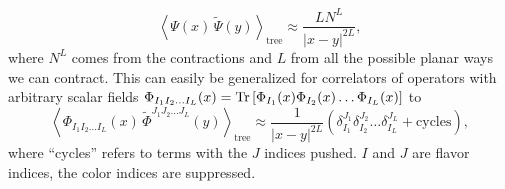 \begin{equation}
	\left< \Psi(x) \, \tilde{\Psi}(y) \right>_{\mathrm{tree}} \approx \frac{L N^L}{|x-y|^{2L}},
\end{equation}
where $N^L$ comes from the contractions and $L$ from all the possible planar ways we can contract. This can easily be generalized for correlators of operators with arbitrary scalar fields $\Phi_{I_1 I_2 \dots I_L}(x) = \mathrm{Tr} \left[ \Phi_{I_1}(x) \Phi_{I_2}(x) \dots \Phi_{I_L}(x) \right]$ to
\begin{equation}
	\left< \Phi_{I_1 I_2 \dots I_L}(x) \, \tilde{\Phi}^{J_1 J_2 \dots J_L}(y)  \right>_{\mathrm{tree}} \approx \frac{1}{|x-y|^{2L}} \left( \delta_{I_1}^{J_1} \delta_{I_2}^{J_2} \dots \delta_{I_L}^{J_L} + \mathrm{cycles} \right),
	\label{eq:tree_correlator}
\end{equation}
where ``cycles'' refers to terms with the $J$ indices pushed. $I$ and $J$ are flavor indices, the color indices are suppressed.
 
